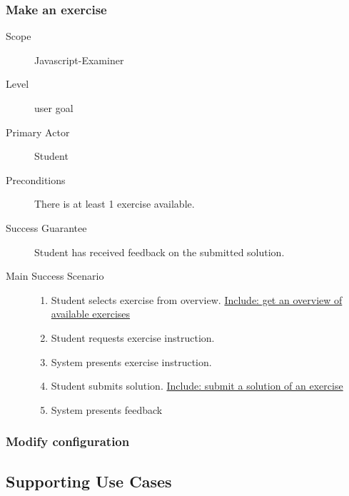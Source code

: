 \subsubsection{Make an exercise}
\begin{mdframed} [rightmargin=-100pt]
\begin{description}
  \item[Scope] Javascript-Examiner
  \item[Level] user goal
  \item[Primary Actor] Student
  \item[Preconditions] There is at least 1 exercise available.
  \item[Success Guarantee] Student has received feedback on the submitted 
	solution.
  \item[Main Success Scenario] \mbox{}
	\begin{enumerate}
	  \item Student selects exercise from overview. \underline{Include: get
        an overview of available exercises}
	  \item Student requests exercise instruction.
	  \item System presents exercise instruction.
	  \item Student submits solution. \underline{Include: submit a solution of 
	    an exercise}
	  \item System presents feedback
	\end{enumerate}
\end{description}
\end{mdframed}

\subsubsection{Modify configuration}
\newpage
\subsection{Supporting Use Cases}

